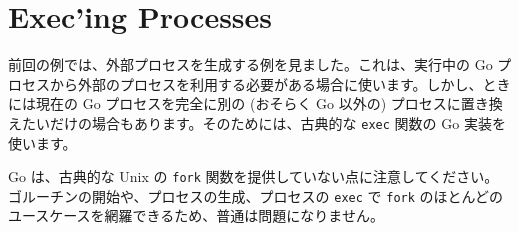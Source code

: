 \section{Exec'ing Processes}

前回の例では、外部プロセスを生成する例を見ました。これは、実行中の Go プロセスから外部のプロセスを利用する必要がある場合に使います。しかし、ときには現在の Go プロセスを完全に別の (おそらく Go 以外の) プロセスに置き換えたいだけの場合もあります。そのためには、古典的な \texttt{exec} 関数の Go 実装を使います。




Go は、古典的な Unix の \texttt{fork} 関数を提供していない点に注意してください。ゴルーチンの開始や、プロセスの生成、プロセスの \texttt{exec} で \texttt{fork} のほとんどのユースケースを網羅できるため、普通は問題になりません。